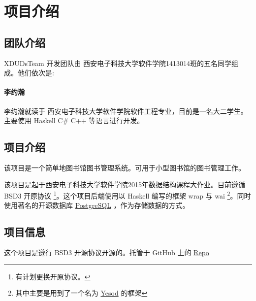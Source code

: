 

\section*{项目介绍}
\subsection*{团队介绍}
XDUDsTeam 开发团队由 西安电子科技大学软件学院1413014班的五名同学组成。他们依次是:
\paragraph{李约瀚} 李约瀚就读于 西安电子科技大学软件学院软件工程专业，目前是一名大二学生。
主要使用 Haskell C\# C++ 等语言进行开发。
\subsection*{项目介绍}
该项目是一个简单地图书馆图书管理系统。可用于小型图书馆的图书管理工作。

该项目是起于西安电子科技大学软件学院2015年数据结构课程大作业。目前遵循 BSD3 开原协议 \footnote{有计划更换开原协议。}。这个项目后端使用以 Haskell 编写的框架 wrap 与 wai \footnote{其中主要是用到了一个名为 \href{https://www.yesodweb.com}{Yesod} 的框架}。同时使用著名的开源数据库
\href{http://www.postgresql.org}{PostgreSQL} ，作为存储数据的方式。
\subsection*{项目信息}
这个项目是遵行 BSD3 开源协议开源的。托管于 GitHub 上的   \href{https://github.com/XDUDsTeam/}{Repo}
